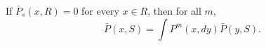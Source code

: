 If $\bar{P}_s(x,R)=0$ for every $x\in R$, then for all $m$,
$$\bar{P}(x,S)=\int P^m(x,dy)\bar{P}(y,S).$$
